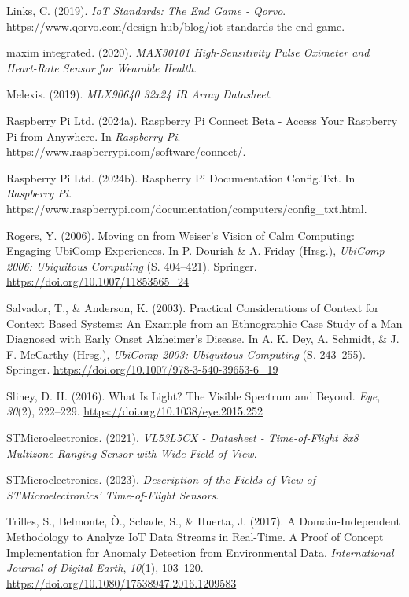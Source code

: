 \documentclass[
  11pt,
  a4paperpaper,
  oneside, openany  ,captions=tableheading
]{scrbook}
\newlength{\cslhangindent}
\newenvironment{CSLReferences}[2] %
  {\begin{list}{}{%
   \setlength{\itemindent}{0pt}
   \setlength{\leftmargin}{0pt}
   \setlength{\parsep}{0pt}
   \ifodd #1
    \setlength{\leftmargin}{\cslhangindent}
    \setlength{\itemindent}{-1\cslhangindent}
   \fi
   \setlength{\itemsep}{#2\baselineskip}}}
  {\end{list}}
\theoremstyle{definition}
\theoremstyle{remark}
\begin{document}
\begin{CSLReferences}{1}{0}
Links, C. (2019). \emph{{IoT Standards}: {The End Game} - {Qorvo}}.
https://www.qorvo.com/design-hub/blog/iot-standards-the-end-game.

maxim integrated. (2020). \emph{{MAX30101 High-Sensitivity Pulse
Oximeter} and {Heart-Rate Sensor} for {Wearable Health}}.

Melexis. (2019). \emph{{MLX90640} 32x24 {IR} Array {Datasheet}}.

Raspberry Pi Ltd. (2024a). Raspberry {Pi Connect Beta} - {Access} Your
{Raspberry Pi} from Anywhere. In \emph{Raspberry Pi}.
https://www.raspberrypi.com/software/connect/.

Raspberry Pi Ltd. (2024b). Raspberry {Pi Documentation} Config.Txt. In
\emph{Raspberry Pi}.
https://www.raspberrypi.com/documentation/computers/config\_txt.html.

Rogers, Y. (2006). Moving on from {Weiser}'s {Vision} of {Calm
Computing}: {Engaging UbiComp Experiences}. In P. Dourish \& A. Friday
(Hrsg.), \emph{{UbiComp} 2006: {Ubiquitous Computing}} (S. 404--421).
Springer. \url{https://doi.org/10.1007/11853565_24}

Salvador, T., \& Anderson, K. (2003). Practical {Considerations} of
{Context} for {Context Based Systems}: {An Example} from an
{Ethnographic Case Study} of a {Man Diagnosed} with {Early Onset
Alzheimer}'s {Disease}. In A. K. Dey, A. Schmidt, \& J. F. McCarthy
(Hrsg.), \emph{{UbiComp} 2003: {Ubiquitous Computing}} (S. 243--255).
Springer. \url{https://doi.org/10.1007/978-3-540-39653-6_19}

Sliney, D. H. (2016). What Is Light? {The} Visible Spectrum and Beyond.
\emph{Eye}, \emph{30}(2), 222--229.
\url{https://doi.org/10.1038/eye.2015.252}

STMicroelectronics. (2021). \emph{{VL53L5CX} - {Datasheet} -
{Time-of-Flight} 8x8 Multizone Ranging Sensor with Wide Field of View}.

STMicroelectronics. (2023). \emph{Description of the Fields of View of
{STMicroelectronics}' {Time-of-Flight} Sensors}.

Trilles, S., Belmonte, Ò., Schade, S., \& Huerta, J. (2017). A
Domain-Independent Methodology to Analyze {IoT} Data Streams in
Real-Time. {A} Proof of Concept Implementation for Anomaly Detection
from Environmental Data. \emph{International Journal of Digital Earth},
\emph{10}(1), 103--120.
\url{https://doi.org/10.1080/17538947.2016.1209583}


\end{CSLReferences}
\end{document}
